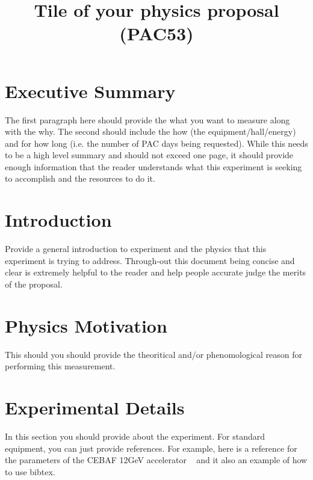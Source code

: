 \documentclass[titlepage,10pt]{article}
\begin{document}
\title{Tile of your physics proposal \\(PAC53)} %


\maketitle

\section*{Executive Summary}

The first paragraph here should provide the what you want to measure along with the why.
The second should include the how (the equipment/hall/energy) and for how long (i.e. the number of PAC days being requested).    While this needs to be a high level summary and should not exceed one page, it should provide enough information that the reader understands what this experiment is seeking to accomplish and the resources to do it.

\newpage

\section{Introduction}

Provide a general introduction to experiment and the physics that this experiment is trying to address.   Through-out this document being concise and clear is extremely helpful to the reader and help people accurate judge the merits of the proposal.    

\section{Physics Motivation}

This should you should provide the theoritical and/or phenomological reason for performing this measurement.

\section{Experimental Details}

In this section you should provide about the experiment.   For standard equipment, you can just provide references.  For example, here is a reference for the parameters of 
the CEBAF 12GeV accelerator ~\cite{Adderley:2024czm} and it also an example of how to use bibtex.  
\end{document}
